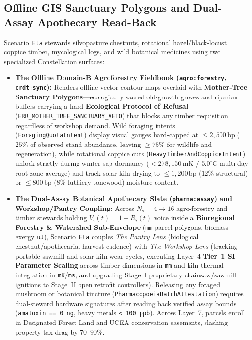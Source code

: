 \subsection{Offline GIS Sanctuary Polygons and Dual-Assay Apothecary Read-Back}

Scenario~\texttt{Eta} stewards silvopasture chestnuts, rotational hazel/black-locust coppice timber, mycological logs, and wild botanical medicines using two specialized Constellation surfaces:
\begin{itemize}
    \item \textbf{The Offline Domain-B Agroforestry Fieldbook (\texttt{agro:forestry}, \texttt{crdt:sync}):} Renders offline vector contour maps overlaid with \textbf{Mother-Tree Sanctuary Polygons}---ecologically sacred old-growth groves and riparian buffers carrying a hard \textbf{Ecological Protocol of Refusal} (\texttt{ERR\_MOTHER\_TREE\_SANCTUARY\_VETO}) that blocks any timber requisition regardless of workshop demand. Wild foraging intents (\texttt{ForagingQuotaIntent}) display visual gauges hard-capped at $\le 2{,}500\,\mathrm{bp}$ ($25\%$ of observed stand abundance, leaving $\ge 75\%$ for wildlife and regeneration), while rotational coppice cuts (\texttt{HeavyTimberAndCoppiceIntent}) unlock strictly during winter sap dormancy ($< 278{,}150\,\mathrm{mK}$ / $5.0^\circ\mathrm{C}$ multi-day root-zone average) and track solar kiln drying to $\le 1{,}200\,\mathrm{bp}$ ($12\%$ structural) or $\le 800\,\mathrm{bp}$ ($8\%$ luthiery tonewood) moisture content.
    \item \textbf{The Dual-Assay Botanical Apothecary Slate (\texttt{pharma:assay}) and Workshop/Pantry Coupling:} Across $N_s = 4 \to 16$ agro-forestry and timber stewards holding $V_i(t) = 1 + R_i(t)$ voice inside a \textbf{Bioregional Forestry \& Watershed Sub-Envelope} (\texttt{mm} parcel polygons, biomass exergy \texttt{uJ}), Scenario~\texttt{Eta} couples \textit{The Pantry Lens} (biological chestnut/apothecarial harvest cadence) with \textit{The Workshop Lens} (tracking portable sawmill and solar-kiln wear cycles, executing Layer~4 \textbf{Tier~1 SI Parameter Scaling} across timber dimensions in \texttt{mm} and kiln thermal integration in \texttt{mK}/\texttt{ms}, and upgrading Stage~I proprietary chainsaw/sawmill ignitions to Stage~II open retrofit controllers). Releasing any foraged mushroom or botanical tincture (\texttt{PharmacopoeiaBatchAttestation}) requires dual-steward hardware signatures after reading back verified assay bounds (\texttt{amatoxin == 0 ng}, heavy metals \texttt{< 100 ppb}). Across Layer~7, parcels enroll in Designated Forest Land and UCEA conservation easements, slashing property-tax drag by $70\text{--}90\%$.
\end{itemize}

